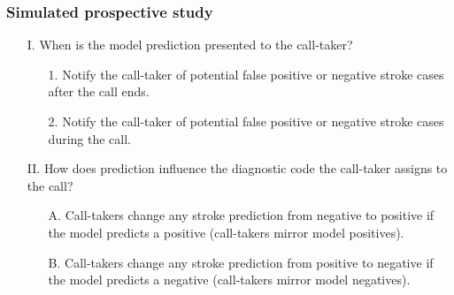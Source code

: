 \begin{frame}
    \frametitle{Simulated prospective study}
    \begin{enumerate}
        \item[I.] {\color{dtured}When} is the model prediction presented to the call-taker?
        \begin{enumerate}
            \item[1.] Notify the call-taker of potential false positive or negative stroke cases after the call ends.
            \item[2.] Notify the call-taker of potential false positive or negative stroke cases during the call.
        \end{enumerate}
        \item[II.] {\color{dtured}How} does prediction influence the diagnostic code the call-taker assigns to the call?
        \begin{enumerate}[label=\Alph*.]
            \item[A.] Call-takers change any stroke prediction from negative to positive if the model predicts a positive (call-takers mirror model positives).
            \item[B.] Call-takers change any stroke prediction from positive to negative if the model predicts a negative (call-takers mirror model negatives).
        \end{enumerate}
    \end{enumerate}
        
\end{frame}


